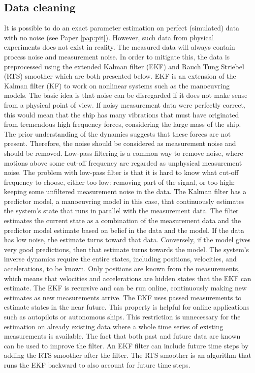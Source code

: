\subsection{Data cleaning}
\label{sec:datacleaning}
It is possible to do an exact parameter estimation on perfect (simulated) data with no noise (see Paper \ref{pap:pit}). However, such data from physical experiments does not exist in reality. The measured data will always contain process noise and measurement noise. In order to mitigate this, the data is preprocessed using the extended Kalman filter (EKF) \cite{brown_introduction_1997} and Rauch Tung Striebel (RTS) smoother \cite{rauch_maximum_1965} which are both presented below.
EKF is an extension of the Kalman filter (KF) to work on nonlinear systems such as the manoeuvring models. The basic idea is that noise can be disregarded if it does not make sense from a physical point of view. If noisy measurement data were perfectly correct, this would mean that the ship has many vibrations that must have originated from tremendous high frequency forces, considering the large mass of the ship. The prior understanding of the dynamics suggests that these forces are not present. Therefore, the noise should be considered as measurement noise and should be removed. Low-pass filtering is a common way to remove noise, where motions above some cut-off frequency are regarded as unphysical measurement noise. The problem with low-pass filter is that it is hard to know what cut-off frequency to choose, either too low: removing part of the signal, or too high: keeping some unfiltered measurement noise in the data. The Kalman filter has a predictor model, a manoeuvring model in this case, that continuously estimates the system’s state that runs in parallel with the measurement data. The filter estimates the current state as a combination of the measurement data and the predictor model estimate based on belief in the data and the model. If the data has low noise, the estimate turns toward that data. Conversely, if the model gives very good predictions, then that estimate turns towards the model.
The system’s inverse dynamics require the entire states, including positions, velocities, and accelerations, to be known. Only positions are known from the measurements, which means that velocities and accelerations are hidden states that the EKF can estimate.
The EKF is recursive and can be run online, continuously making new estimates as new measurements arrive. The EKF uses passed measurements to estimate states in the near future. This property is helpful for online applications such as  autopilots or autonomous ships. This restriction is  unnecessary for the estimation on already existing data where a whole time series of existing measurements is available. The fact that both past and future data are known can be used to improve the filter. An EKF filter can include future time steps by adding the RTS smoother after the filter. The RTS smoother is an algorithm that runs the EKF backward to also account for future time steps.

